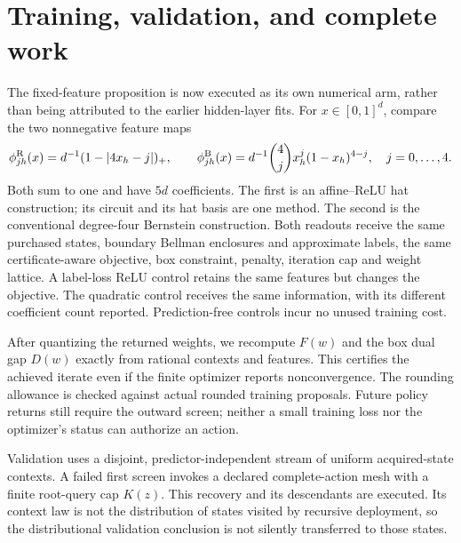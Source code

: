 \section{Training, validation, and complete work}\label{sec:training69}
The fixed-feature proposition is now executed as its own numerical arm, rather than being attributed to the earlier hidden-layer fits. For $x\in[0,1]^d$, compare the two nonnegative feature maps
\[
 \phi_{jh}^{\rm R}(x)=d^{-1}(1-|4x_h-j|)_+,
 \qquad
 \phi_{jh}^{\rm B}(x)=d^{-1}{4\choose j}x_h^j(1-x_h)^{4-j},
 \quad j=0,\ldots,4.
\]
Both sum to one and have $5d$ coefficients. The first is an affine--ReLU hat construction; its circuit and its hat basis are one method. The second is the conventional degree-four Bernstein construction. Both readouts receive the same purchased states, boundary Bellman enclosures and approximate labels, the same certificate-aware objective, box constraint, penalty, iteration cap and weight lattice. A label-loss ReLU control retains the same features but changes the objective. The quadratic control receives the same information, with its different coefficient count reported. Prediction-free controls incur no unused training cost.

After quantizing the returned weights, we recompute $F(w)$ and the box dual gap $D(w)$ exactly from rational contexts and features. This certifies the achieved iterate even if the finite optimizer reports nonconvergence. The rounding allowance is checked against actual rounded training proposals. Future policy returns still require the outward screen; neither a small training loss nor the optimizer's status can authorize an action.

Validation uses a disjoint, predictor-independent stream of uniform acquired-state contexts. A failed first screen invokes a declared complete-action mesh with a finite root-query cap $K(z)$. This recovery and its descendants are executed. Its context law is not the distribution of states visited by recursive deployment, so the distributional validation conclusion is not silently transferred to those states.

